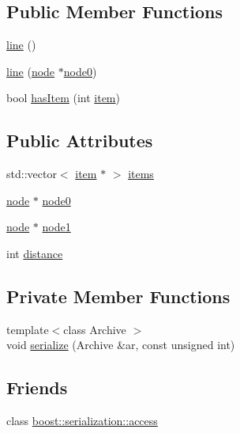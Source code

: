 \subsection*{\-Public \-Member \-Functions}
\begin{DoxyCompactItemize}
\item 
\hyperlink{classline_a854d4e37d6dc6af1c7cd08cb801c6c26}{line} ()
\item 
\hyperlink{classline_ae2dcc9357e30db586dc84701a9062cf8}{line} (\hyperlink{classnode}{node} $\ast$\hyperlink{classline_a12a1b9a7e00560e559aec4a4753a50ef}{node0})
\item 
bool \hyperlink{classline_a7864bb1bcfa4770acf64ab2c3f8398f2}{has\-Item} (int \hyperlink{classitem}{item})
\end{DoxyCompactItemize}
\subsection*{\-Public \-Attributes}
\begin{DoxyCompactItemize}
\item 
std\-::vector$<$ \hyperlink{classitem}{item} $\ast$ $>$ \hyperlink{classline_afc47d5dc7b895126e90664594977ff8b}{items}
\item 
\hyperlink{classnode}{node} $\ast$ \hyperlink{classline_a12a1b9a7e00560e559aec4a4753a50ef}{node0}
\item 
\hyperlink{classnode}{node} $\ast$ \hyperlink{classline_a7d34083bf3194855290b5b5253d95a4a}{node1}
\item 
int \hyperlink{classline_a255bc674eb5526f5cad9a9e65368b095}{distance}
\end{DoxyCompactItemize}
\subsection*{\-Private \-Member \-Functions}
\begin{DoxyCompactItemize}
\item 
{\footnotesize template$<$class Archive $>$ }\\void \hyperlink{classline_ae6b55c007b3578b60699714d4cb78624}{serialize} (\-Archive \&ar, const unsigned int)
\end{DoxyCompactItemize}
\subsection*{\-Friends}
\begin{DoxyCompactItemize}
\item 
class \hyperlink{classline_ac98d07dd8f7b70e16ccb9a01abf56b9c}{boost\-::serialization\-::access}
\end{DoxyCompactItemize}


